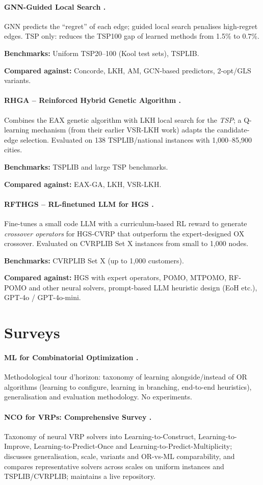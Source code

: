 \documentclass[11pt]{article}
\newcommand{\benchline}[1]{\par\smallskip\noindent\textbf{Benchmarks:} #1}
\newcommand{\baseline}[1]{\par\noindent\textbf{Compared against:} #1}
\begin{document}
\paragraph{GNN-Guided Local Search \citep{hudson_graph_2021}.}
GNN predicts the ``regret'' of each edge; guided local search penalises high-regret edges.
TSP only: reduces the TSP100 gap of learned methods from 1.5\% to 0.7\%.
\benchline{Uniform TSP20--100 (Kool test sets), TSPLIB.}
\baseline{Concorde, LKH, AM, GCN-based predictors, 2-opt/GLS variants.}

\paragraph{RHGA -- Reinforced Hybrid Genetic Algorithm \citep{zheng_reinforced_2023}.}
Combines the EAX genetic algorithm with LKH local search for the \emph{TSP}; a Q-learning
mechanism (from their earlier VSR-LKH work) adapts the candidate-edge selection. Evaluated
on 138 TSPLIB/national instances with 1{,}000--85{,}900 cities.
\benchline{TSPLIB and large TSP benchmarks.}
\baseline{EAX-GA, LKH, VSR-LKH.}

\paragraph{RFTHGS -- RL-finetuned LLM for HGS \citep{zhu_refining_2025}.}
Fine-tunes a small code LLM with a curriculum-based RL reward to generate \emph{crossover
operators} for HGS-CVRP that outperform the expert-designed OX crossover. Evaluated on
CVRPLIB Set X instances from small to 1{,}000 nodes.
\benchline{CVRPLIB Set X (up to 1{,}000 customers).}
\baseline{HGS with expert operators, POMO, MTPOMO, RF-POMO and other neural solvers,
prompt-based LLM heuristic design (EoH etc.), GPT-4o / GPT-4o-mini.}

\section{Surveys}

\paragraph{ML for Combinatorial Optimization \citep{bengio_machine_2018}.}
Methodological tour d'horizon: taxonomy of learning alongside/instead of OR algorithms
(learning to configure, learning in branching, end-to-end heuristics), generalisation and
evaluation methodology. No experiments.

\paragraph{NCO for VRPs: Comprehensive Survey \citep{wu_neural_survey_2024}.}
Taxonomy of neural VRP solvers into Learning-to-Construct, Learning-to-Improve,
Learning-to-Predict-Once and Learning-to-Predict-Multiplicity; discusses generalisation,
scale, variants and OR-vs-ML comparability, and compares representative solvers across
scales on uniform instances and TSPLIB/CVRPLIB; maintains a live repository.
\end{document}
